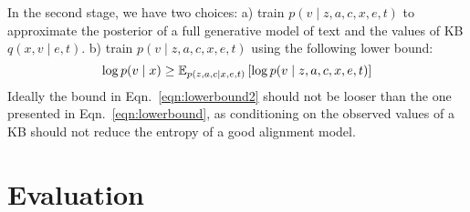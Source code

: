 \documentclass[12pt]{article}
\begin{document}
In the second stage, we have two choices:
a) train $p(v \mid z,a,c,x,e,t)$ to approximate the posterior of a full generative model of text and
the values of KB $q(x,v\mid e,t)$.
b) train $p(v \mid z,a,c,x,e,t)$ using the following lower bound:
\begin{equation}
\label{eqn:lowerbound2}
\log p(v\mid x) \geq
\mathbb{E}_{p(z,a,c\mid x,e,t)}\left[\log p(v\mid z,a,c, x,e,t)\right]
\end{equation}
Ideally the bound in Eqn.~\ref{eqn:lowerbound2}
should not be looser than the one presented in Eqn.~\ref{eqn:lowerbound},
as conditioning on the observed values of a KB should not reduce the entropy of
a good alignment model.

\section{Evaluation}
\end{document}
